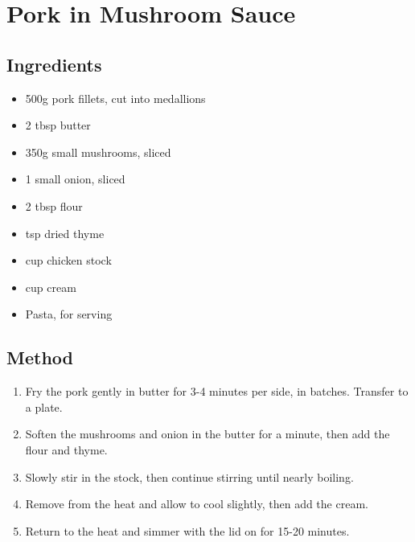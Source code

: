 \clearpage
\section{Pork in Mushroom Sauce}


\subsection{Ingredients}

\begin{itemize}
	\item 500g pork fillets, cut into medallions
	\item 2 tbsp butter
	\item 350g small mushrooms, sliced
	\item 1 small onion, sliced
	\item 2 tbsp flour
	\item {} tsp dried thyme
	\item {} cup chicken stock
	\item {} cup cream
	\item Pasta, for serving
\end{itemize}

\subsection{Method}

\begin{enumerate}
    \item Fry the pork gently in butter for 3-4 minutes per side, in batches. Transfer to a plate.
	\item Soften the mushrooms and onion in the butter for a minute, then add the flour and thyme.
	\item Slowly stir in the stock, then continue stirring until nearly boiling.
	\item Remove from the heat and allow to cool slightly, then add the cream.
	\item Return to the heat and simmer with the lid on for 15-20 minutes.
\end{enumerate}
